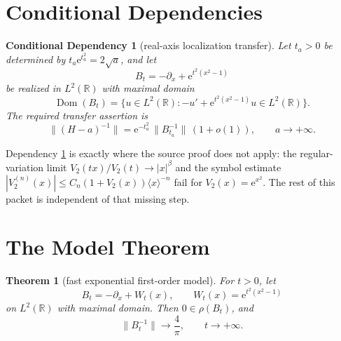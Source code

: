 \documentclass[11pt]{article}
\newtheorem{theorem}{Theorem}
\newtheorem{dependency}{Conditional Dependency}
\newcommand{\R}{\mathbb R}
\newcommand{\Dom}{\operatorname{Dom}}
\newcommand{\e}{\mathrm e}
\begin{document}
\section*{Conditional Dependencies}

\begin{dependency}[real-axis localization transfer]\label{dep:transfer}
Let \(t_a>0\) be determined by \(t_a\e^{t_a^2}=2\sqrt a\), and let
\[
    B_t=-\partial_x+\e^{t^2(x^2-1)}
\]
be realized in \(L^2(\R)\) with maximal domain
\[
    \Dom(B_t)=\{u\in L^2(\R):-u'+\e^{t^2(x^2-1)}u\in L^2(\R)\}.
\]
The required transfer assertion is
\[
    \|(H-a)^{-1}\|
    = \e^{-t_a^2}\,\|B_{t_a}^{-1}\|\,(1+o(1)),
    \qquad a\to+\infty.
\]
\end{dependency}

Dependency \ref{dep:transfer} is exactly where the source proof does not apply:
the regular-variation limit \(V_2(tx)/V_2(t)\to |x|^\beta\) and the symbol
estimate \(|V_2^{(n)}(x)|\le C_n(1+V_2(x))\langle x\rangle^{-n}\) fail for
\(V_2(x)=\e^{x^2}\).  The rest of this packet is independent of that missing
step.

\section*{The Model Theorem}

\begin{theorem}[fast exponential first-order model]\label{thm:model}
For \(t>0\), let
\[
    B_t=-\partial_x+W_t(x),
    \qquad W_t(x)=\e^{t^2(x^2-1)}
\]
on \(L^2(\R)\) with maximal domain.  Then \(0\in\rho(B_t)\), and
\[
    \|B_t^{-1}\|\longrightarrow \frac{4}{\pi},
    \qquad t\to+\infty.
\]
\end{theorem}
\end{document}
